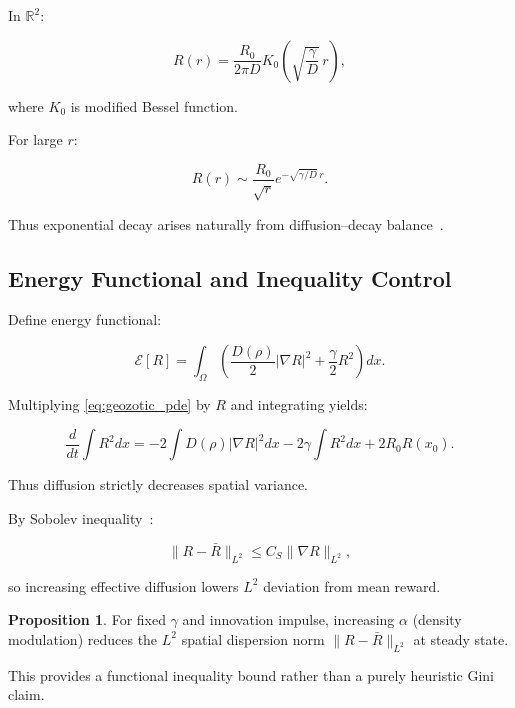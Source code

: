 \documentclass[12pt,a4paper]{article}
\theoremstyle{definition}
\newtheorem{proposition}{Proposition}[section]
\begin{document}
In $\mathbb{R}^2$:

\begin{equation}
  R(r) =
  \frac{R_0}{2\pi D}
  K_0\!\left( \sqrt{\frac{\gamma}{D}}\, r \right),
\end{equation}

where $K_0$ is modified Bessel function.

For large $r$:

\begin{equation}
  R(r) \sim
  \frac{R_0}{\sqrt{r}}
  e^{-\sqrt{\gamma/D}\, r}.
\end{equation}

Thus exponential decay arises naturally from
diffusion–decay balance~\citep{turing1952}.

\subsection{Energy Functional and Inequality Control}

Define energy functional:

\begin{equation}
  \mathcal{E}[R]
  =
  \int_\Omega
  \left(
  \frac{D(\rho)}{2} |\nabla R|^2
  + \frac{\gamma}{2} R^2
  \right)
  dx.
\end{equation}

Multiplying \eqref{eq:geozotic_pde} by $R$
and integrating yields:

\begin{equation}
  \frac{d}{dt}
  \int R^2 dx
  =
  -2 \int D(\rho) |\nabla R|^2 dx
  -2\gamma \int R^2 dx
  + 2R_0 R(x_0).
\end{equation}

Thus diffusion strictly decreases spatial variance.

By Sobolev inequality~\citep{lieb2001}:

\begin{equation}
  \|R - \bar{R}\|_{L^2}
  \le C_S
  \|\nabla R\|_{L^2},
\end{equation}

so increasing effective diffusion lowers
$L^2$ deviation from mean reward.

\begin{proposition}
  For fixed $\gamma$ and innovation impulse,
  increasing $\alpha$ (density modulation)
  reduces the $L^2$ spatial dispersion norm
  $\|R - \bar{R}\|_{L^2}$ at steady state.
\end{proposition}

This provides a functional inequality bound
rather than a purely heuristic Gini claim.
\end{document}
